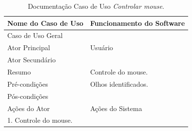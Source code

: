 \begin{longtable}{|l|l|}
\caption{Documentação Caso de Uso \textit{Controlar mouse}.} \label{tab:dcu-1} \\
\hline 
\multicolumn{1}{|c|}{\textbf{Nome do Caso de Uso}} & 
\multicolumn{1}{c|}{\textbf{Funcionamento do Software}} \\ \hline 
\endfirsthead
\hline
Caso de Uso Geral &  \\ \hline
Ator Principal & Usuário\\ \hline
Ator Secundário & \\ \hline
Resumo & Controle do mouse. \\ \hline 
Pré-condições &  Olhos identificados. \\ \hline 
Pós-condições &  \\ \hline
Ações do Ator& Ações do Sistema \\ \hline
 1. Controle do mouse. &  \\ \hline
\end{longtable}

